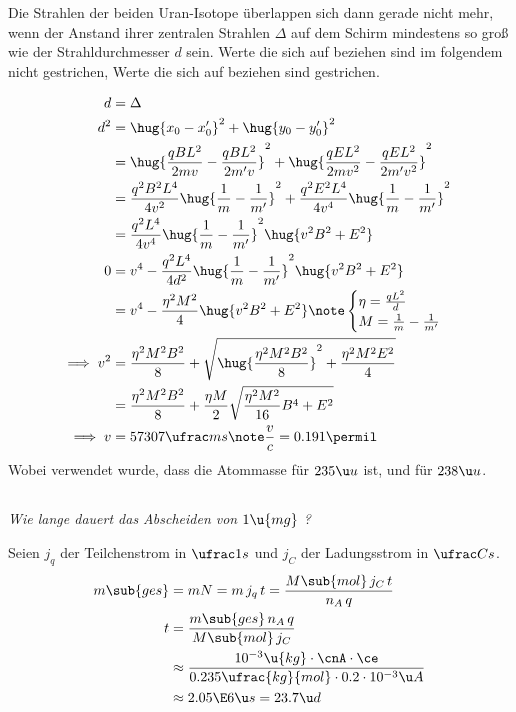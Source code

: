 \documentclass[ex,minted,hatbasis]{exercise_4.0}
\begin{document}
 Die Strahlen der beiden Uran-Isotope überlappen sich dann gerade nicht mehr, wenn der Anstand ihrer zentralen Strahlen $\Delta$ auf dem Schirm mindestens so groß wie der Strahldurchmesser $d$ sein. Werte die sich auf \urana{} beziehen sind im folgendem nicht gestrichen, Werte die sich auf \uranb{} beziehen sind gestrichen.

\begin{align*}
    d &= \Delta\\
    d^2 &= \hug{x_0 - x_0'}^2 + \hug{y_0 - y_0'}^2 \\
    &= \hug{\frac{q B L^2}{2 m v} - \frac{q B L^2}{2 m' v}}^2 + \hug{\frac{q E L^2}{2 m v^2} - \frac{q E L^2}{2 m' v^2}}^2 \\
    &= \frac{q^2 B^2 L^4}{4 v^2}\hug{\frac1m - \frac1{m'}}^2 + \frac{q^2 E^2 L^4}{4 v^4}\hug{\frac{1}{m} - \frac1{m'}}^2 \\
    &= \frac{q^2 L^4}{4 v^4}\hug{\frac{1}{m} - \frac1{m'}}^2\hug{v^2B^2 + E^2} \\
    0 &= v^4 - \frac{q^2 L^4}{4d^2}\hug{\frac{1}{m} - \frac1{m'}}^2\hug{v^2B^2 + E^2} \\
    &= v^4 - \frac{\eta^2 M^2}{4}\hug{v^2B^2 + E^2} \note \begin{cases}
        \eta = \frac{q L^2}{d}\\
        M = \frac{1}{m} - \frac1{m'}
    \end{cases}\\
    \implies v^2 &= \frac{\eta^2 M^2 B^2}{8} + \sqrt{\hug{\frac{\eta^2 M^2 B^2}{8}}^2 + \frac{\eta^2 M^2 E^2}{4}}\\
    &= \frac{\eta^2 M^2 B^2}{8} + \frac{\eta M}{2} \sqrt{\frac{\eta^2 M^2}{16}B^4  + E^2}\\
    \implies v &= 57307 \ufrac ms\note \frac vc= 0.191\permil
\end{align*}
Wobei verwendet wurde, dass die Atommasse für \urana{} $235\u u$ ist, und für \uranb{} $238\u u$.



\subsection{}
\textit{Wie lange dauert das Abscheiden von $1 \u{mg}$ ?}\vspace{2ex}

Seien $j_q$ der Teilchenstrom in $\ufrac 1s$ und $j_C$ der Ladungsstrom in $\ufrac Cs$.
\begin{align*}
    m\sub{ges} &= m N = m\, j_q\, t = \frac{M\sub{mol}\, j_C\, t}{n_A\, q} \\
    t &=\frac{m\sub{ges}\,n_A\, q}{M\sub{mol}\, j_C}\\
    &\approx\frac{10^{-3}\u{kg} \cdot \cnA \cdot \ce}{0.235\ufrac{kg}{mol}\cdot0.2\cdot10^{-3}\u A}\\
    &\approx 2.05\E6 \u s = 23.7 \u d
\end{align*}
\end{document}
